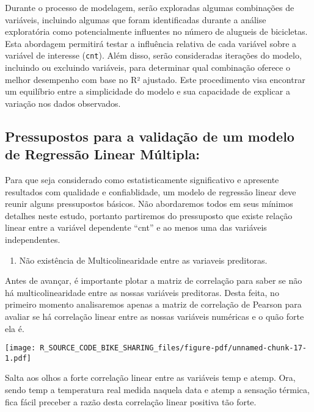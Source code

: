 \documentclass[
  letterpaper,
  DIV=11,
  numbers=noendperiod]{scrartcl}
\providecommand{\tightlist}{%
  \setlength{\itemsep}{0pt}\setlength{\parskip}{0pt}}\usepackage{longtable,booktabs,array}
\begin{document}
Durante o processo de modelagem, serão exploradas algumas combinações de
variáveis, incluindo algumas que foram identificadas durante a análise
exploratória como potencialmente influentes no número de alugueis de
bicicletas. Esta abordagem permitirá testar a influência relativa de
cada variável sobre a variável de interesse (\texttt{cnt}). Além disso,
serão consideradas iterações do modelo, incluindo ou excluindo
variáveis, para determinar qual combinação oferece o melhor desempenho
com base no R² ajustado. Este procedimento visa encontrar um equilíbrio
entre a simplicidade do modelo e sua capacidade de explicar a variação
nos dados observados.

\subsection{Pressupostos para a validação de um modelo de Regressão
Linear
Múltipla:}\label{pressupostos-para-a-validauxe7uxe3o-de-um-modelo-de-regressuxe3o-linear-muxfaltipla}

Para que seja considerado como estatisticamente significativo e
apresente resultados com qualidade e confiablidade, um modelo de
regressão linear deve reunir alguns pressupostos básicos. Não
abordaremos todos em seus mínimos detalhes neste estudo, portanto
partiremos do pressuposto que existe relação linear entre a variável
dependente ``cnt'' e ao menos uma das variáveis independentes.

\begin{enumerate}
\def\labelenumi{\arabic{enumi})}
\tightlist
\item
  Não existência de Multicolinearidade entre as variaveis preditoras.
\end{enumerate}

Antes de avançar, é importante plotar a matriz de correlação para saber
se não há multicolinearidade entre as nossas variáveis preditoras. Desta
feita, no primeiro momento analisaremos apenas a matriz de correlação de
Pearson para avaliar se há correlação linear entre as nossas variáveis
numéricas e o quão forte ela é.

\begin{center}
\texttt{[image: R\_SOURCE\_CODE\_BIKE\_SHARING\_files/figure-pdf/unnamed-chunk-17-1.pdf]}
\end{center}

Salta aos olhos a forte correlação linear entre as variáveis temp e
atemp. Ora, sendo temp a temperatura real medida naquela data e atemp a
sensação térmica, fica fácil preceber a razão desta correlação linear
positiva tão forte.
\end{document}
